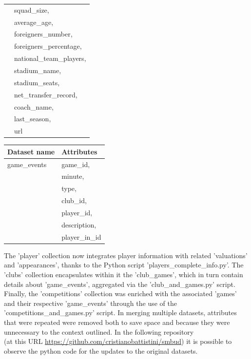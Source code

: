 \documentclass{Configuration_Files/PoliMi3i_thesis}
\begin{document}
\begin{tabular}{|l|p{13cm}|}
    & squad\_size,                              \\
    & average\_age,                             \\
    & foreigners\_number,                       \\
    & foreigners\_percentage,                   \\
    & national\_team\_players,                  \\
    & stadium\_name,                            \\
    & stadium\_seats,                           \\
    & net\_transfer\_record,                    \\
    & coach\_name,                              \\
    & last\_season,                             \\
    & url                                       \\
\hline
\end{tabular}

\begin{tabular}{|l|p{13cm}|}
	\hline
	\textbf{Dataset name} & \textbf{Attributes}                       \\
	\hline
    game\_events
    & game\_id,                                 \\
    & minute,                                   \\
    & type,                                     \\
    & club\_id,                                 \\
    & player\_id,                               \\
    & description,                              \\
    & player\_in\_id                            \\
\hline
\end{tabular}

The 'player' collection now integrates player information with related 'valuations' and 'appearances', thanks to the Python script 'players\_complete\_info.py'. The 'clubs' collection encapsulates within it the 'club\_games', which in turn contain details about 'game\_events', aggregated via the 'club\_and\_games.py' script. Finally, the 'competitions' collection was enriched with the associated 'games' and their respective 'game\_events' through the use of the 'competitions\_and\_games.py' script.
In merging multiple datasets, attributes that were repeated were removed both to save space and because they were unnecessary to the context outlined.
In the following repository \\
(at this URL \url{https://github.com/cristianobattistini/smbud}) it is possible to observe the python code for the updates to the original datasets.
\end{document}
